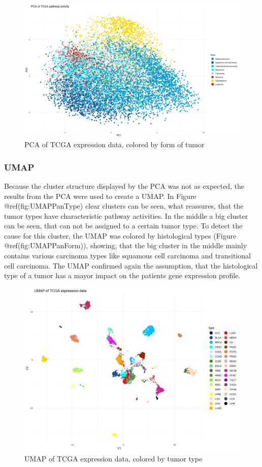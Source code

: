 \documentclass[
  parskip,
  oneside]{scrreprt}
\begin{document}
\begin{figure}

{\centering \includegraphics[width=0.75\linewidth]{figures/Pan Cancer PCA PC1und2 cancer form} 

}

\caption{PCA of TCGA expression data, colored by form of tumor}\label{fig:PCAPanForm}
\end{figure}

\hypertarget{umap}{%
\subsubsection{UMAP}\label{umap}}

Because the cluster structure displayed by the PCA was not as expected,
the results from the PCA were used to create a UMAP. In Figure
@ref(fig:UMAPPanType) clear clusters can be seen, what reassures, that
the tumor types have characteristic pathway activities. In the middle a
big cluster can be seen, that can not be assigned to a certain tumor
type. To detect the cause for this cluster, the UMAP was colored by
histological types (Figure @ref(fig:UMAPPanForm)), showing, that the big
cluster in the middle mainly contains various carcinoma types like
squamous cell carcinoma and transitional cell carcinoma. The UMAP
confirmed again the assumption, that the histological type of a tumor
has a mayor impact on the patients gene expression profile.

\begin{figure}

{\centering \includegraphics[width=0.5\linewidth]{figures/Pan Cancer UMAP} 

}

\caption{UMAP of TCGA expression data, colored by tumor type}\label{fig:UMAPPanType}
\end{figure}
\end{document}
